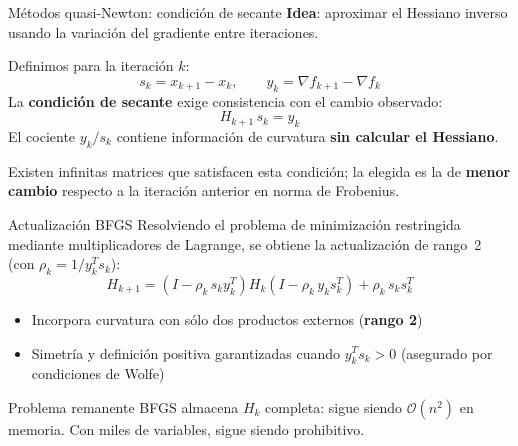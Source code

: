 \documentclass[11pt]{beamer}
\begin{document}
\begin{frame}{Métodos quasi-Newton: condición de secante}
\textbf{Idea}: aproximar el Hessiano inverso usando la variación del gradiente entre iteraciones.

Definimos para la iteración $k$:
\[
    s_k = x_{k+1} - x_k, \qquad y_k = \nabla f_{k+1} - \nabla f_k
\]
La \textbf{condición de secante} exige consistencia con el cambio observado:
\[
    H_{k+1}\, s_k = y_k
\]
El cociente $y_k / s_k$ contiene información de curvatura \textbf{sin calcular el Hessiano}.

Existen infinitas matrices que satisfacen esta condición; la elegida es la de \textbf{menor cambio} respecto a la iteración anterior en norma de Frobenius.
\end{frame}

\begin{frame}{Actualización BFGS}
Resolviendo el problema de minimización restringida mediante multiplicadores de Lagrange, se obtiene la actualización de rango~2 (con $\rho_k = 1/y_k^T s_k$):
\[
    H_{k+1}
    =
    \left(I - \rho_k\, s_k y_k^T\right)
    H_k
    \left(I - \rho_k\, y_k s_k^T\right)
    + \rho_k\, s_k s_k^T
\]
\begin{itemize}
    \item Incorpora curvatura con sólo dos productos externos (\textbf{rango 2})
    \item Simetría y definición positiva garantizadas cuando $y_k^T s_k > 0$ (asegurado por condiciones de Wolfe)
\end{itemize}
\begin{alertblock}{Problema remanente}
    BFGS almacena $H_k$ completa: sigue siendo $\mathcal{O}(n^2)$ en memoria. Con miles de variables, sigue siendo prohibitivo.
\end{alertblock}
\end{frame}
\end{document}
